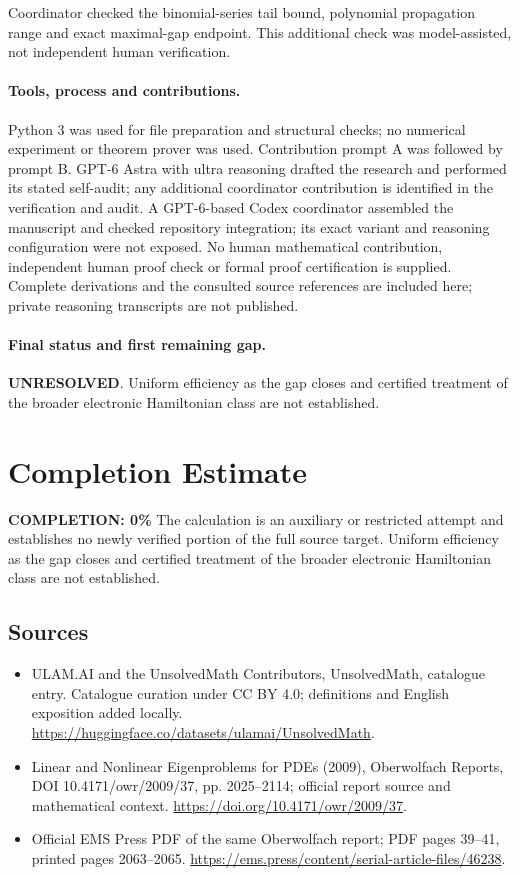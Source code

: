 \documentclass[11pt]{article}
\begin{document}
Coordinator checked the binomial-series tail bound, polynomial propagation range and exact maximal-gap endpoint. This additional check was model-assisted, not independent human verification.

\paragraph{Tools, process and contributions.}
Python 3 was used for file preparation and structural checks; no numerical experiment or theorem prover was used. Contribution prompt A was followed by prompt B. GPT-6 Astra with ultra reasoning drafted the research and performed its stated self-audit; any additional coordinator contribution is identified in the verification and audit. A GPT-6-based Codex coordinator assembled the manuscript and checked repository integration; its exact variant and reasoning configuration were not exposed. No human mathematical contribution, independent human proof check or formal proof certification is supplied. Complete derivations and the consulted source references are included here; private reasoning transcripts are not published.

\paragraph{Final status and first remaining gap.}
\textbf{UNRESOLVED}. Uniform efficiency as the gap closes and certified treatment of the broader electronic Hamiltonian class are not established.

\section{Completion Estimate}
\noindent\textbf{COMPLETION: 0\%}
The calculation is an auxiliary or restricted attempt and establishes no newly verified portion of the full source target. Uniform efficiency as the gap closes and certified treatment of the broader electronic Hamiltonian class are not established.

\subsection{Sources}
\begin{itemize}
\item[\hypertarget{source:statement:1}{S1}] ULAM.AI and the UnsolvedMath Contributors, UnsolvedMath, catalogue entry. Catalogue curation under CC BY 4.0; definitions and English exposition added locally.
\url{https://huggingface.co/datasets/ulamai/UnsolvedMath}.
\item[\hypertarget{source:statement:2}{S2}] Linear and Nonlinear Eigenproblems for PDEs (2009), Oberwolfach Reports, DOI 10.4171/owr/2009/37, pp. 2025--2114; official report source and mathematical context.
\url{https://doi.org/10.4171/owr/2009/37}.
\item[\hypertarget{source:statement:3}{S3}] Official EMS Press PDF of the same Oberwolfach report; PDF pages 39--41, printed pages 2063--2065.
\url{https://ems.press/content/serial-article-files/46238}.
\end{itemize}
\label{end:statement}
\end{document}
